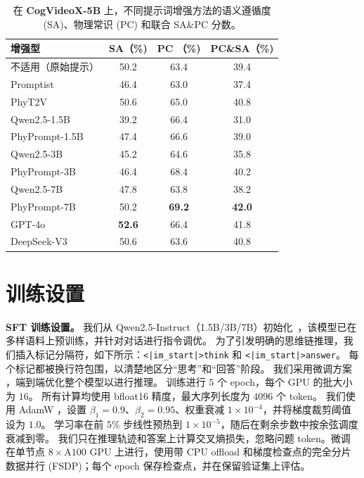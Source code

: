 \begin{table}[ht]
  \centering
  \caption{在 \textbf{CogVideoX-5B} 上，不同提示词增强方法的语义遵循度 (SA)、物理常识 (PC) 和联合 SA\&PC 分数。}
  \setlength{\tabcolsep}{3pt}
  \label{tab:enhanced_cv5b}
  \begin{tabular}{lccc}
    \toprule
    \textbf{增强型}   & \textbf{SA（\%)} & \textbf{PC （\%)} & \textbf{PC\&SA（\%)} \\
    \midrule
    不适用（原始提示）     & 50.2             & 63.4             & 39.4                   \\
    Promptist                 & 46.4             & 63.0             & 37.4                   \\
    PhyT2V                    & 50.6             & 65.0             & 40.8                   \\
    \midrule
    Qwen2.5-1.5B              & 39.2             & 66.4             & 31.0                   \\
    PhyPrompt-1.5B            & 47.4             & 66.6             & 39.0                   \\
    Qwen2.5-3B                & 45.2             & 64.6             & 35.8                   \\
    PhyPrompt-3B              & 46.4             & 68.4             & 40.2                   \\
    Qwen2.5-7B                & 47.8             & 63.8             & 38.2                   \\
    PhyPrompt-7B              & 50.2             & \textbf{69.2}             & \textbf{42.0}                  \\
    \midrule
    GPT-4o                    & \textbf{52.6}             & 66.4             & 41.8                   \\
    DeepSeek-V3               & 50.6             & 63.6             & 40.8                   \\
    \bottomrule
  \end{tabular}
\end{table}


\section{训练设置}
\textbf{SFT 训练设置。}
我们从 Qwen2.5-Instruct（1.5B/3B/7B）初始化~\cite{Qwen2024}，该模型已在多样语料上预训练，并针对对话进行指令调优。
为了引发明确的思维链推理，我们插入标记分隔符，如下所示：\texttt{<|im\_start|>think} 和 \texttt{<|im\_start|>answer}。
每个标记都被换行符包围，以清楚地区分“思考”和“回答”阶段。
我们采用微调方案 \cite{muennighoff2025simple}，端到端优化整个模型以进行推理。
训练进行 $5$ 个 epoch，每个 GPU 的批大小为 $16$。
所有计算均使用 bfloat16 精度，最大序列长度为 $4096$ 个 token。
我们使用 AdamW \cite{loshchilov2019decoupled}，设置 $\beta_{1}=0.9$、$\beta_{2}=0.95$、权重衰减 $1\times10^{-4}$，并将梯度裁剪阈值设为 $1.0$。
学习率在前 $5\%$ 步线性预热到 $1\times10^{-5}$，随后在剩余步数中按余弦调度衰减到零。
我们只在推理轨迹和答案上计算交叉熵损失，忽略问题 token。微调在单节点 $8\times\mathrm{A}100$ GPU 上进行，使用带 CPU offload 和梯度检查点的完全分片数据并行 (FSDP)；每个 epoch 保存检查点，并在保留验证集上评估。


